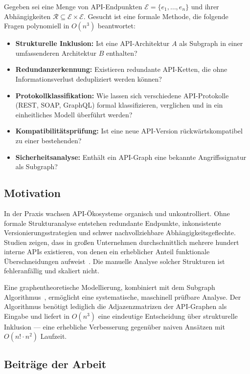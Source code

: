 ﻿\documentclass[a4paper,12pt]{article}
\theoremstyle{definition}
\begin{document}
Gegeben sei eine Menge von API-Endpunkten $\mathcal{E} = \{e_1, \ldots, e_n\}$
und ihrer Abhängigkeiten $\mathcal{R} \subseteq \mathcal{E} \times \mathcal{E}$.
Gesucht ist eine formale Methode, die folgende Fragen polynomiell in $O(n^3)$ beantwortet:
\begin{itemize}
  \item \textbf{Strukturelle Inklusion:} Ist eine API-Architektur $A$ als Subgraph in
    einer umfassenderen Architektur $B$ enthalten?
  \item \textbf{Redundanzerkennung:} Existieren redundante API-Ketten, die ohne
    Informationsverlust dedupliziert werden können?
  \item \textbf{Protokollklassifikation:} Wie lassen sich verschiedene API-Protokolle
    (REST, SOAP, GraphQL) formal klassifizieren, verglichen und in ein einheitliches
    Modell überführt werden?
  \item \textbf{Kompatibilitätsprüfung:} Ist eine neue API-Version rückwärts\-kompatibel
    zu einer bestehenden?
  \item \textbf{Sicherheitsanalyse:} Enthält ein API-Graph eine bekannte Angriffssignatur
    als Subgraph?
\end{itemize}

\subsection{Motivation}

In der Praxis wachsen API-Ökosysteme organisch und unkontrolliert. Ohne formale
Strukturanalyse entstehen redundante Endpunkte, inkonsistente Versionierungsstrategien
und schwer nachvollziehbare Abhängigkeitsgeflechte. Studien zeigen, dass in großen
Unternehmen durchschnittlich mehrere hundert interne APIs existieren, von denen
ein erheblicher Anteil funktionale Überschneidungen aufweist~\cite{newman2015}.
Die manuelle Analyse solcher Strukturen ist fehleranfällig und skaliert nicht.

Eine graphentheoretische Modellierung, kombiniert mit dem Subgraph Algorithmus~\cite{epp2026},
ermöglicht eine systematische, maschinell prüfbare Analyse. Der Algorithmus benötigt
lediglich die Adjazenzmatrizen der API-Graphen als Eingabe und liefert in $O(n^3)$
eine eindeutige Entscheidung über strukturelle Inklusion --- eine erhebliche Verbesserung
gegenüber naiven Ansätzen mit $O(n! \cdot n^2)$ Laufzeit.

\subsection{Beiträge der Arbeit}
\end{document}
